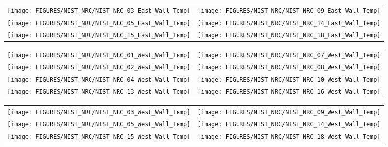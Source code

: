 \begin{figure}[p]
\begin{tabular*}{\textwidth}{l@{\extracolsep{\fill}}r}
\texttt{[image: FIGURES/NIST\_NRC/NIST\_NRC\_03\_East\_Wall\_Temp]} &
\texttt{[image: FIGURES/NIST\_NRC/NIST\_NRC\_09\_East\_Wall\_Temp]} \\
\texttt{[image: FIGURES/NIST\_NRC/NIST\_NRC\_05\_East\_Wall\_Temp]} &
\texttt{[image: FIGURES/NIST\_NRC/NIST\_NRC\_14\_East\_Wall\_Temp]} \\
\texttt{[image: FIGURES/NIST\_NRC/NIST\_NRC\_15\_East\_Wall\_Temp]} &
\texttt{[image: FIGURES/NIST\_NRC/NIST\_NRC\_18\_East\_Wall\_Temp]}
\end{tabular*}
\label{NIST_NRC_East_Wall_Temp_Open}
\end{figure}

\begin{figure}[p]
\begin{tabular*}{\textwidth}{l@{\extracolsep{\fill}}r}
\texttt{[image: FIGURES/NIST\_NRC/NIST\_NRC\_01\_West\_Wall\_Temp]} &
\texttt{[image: FIGURES/NIST\_NRC/NIST\_NRC\_07\_West\_Wall\_Temp]} \\
\texttt{[image: FIGURES/NIST\_NRC/NIST\_NRC\_02\_West\_Wall\_Temp]} &
\texttt{[image: FIGURES/NIST\_NRC/NIST\_NRC\_08\_West\_Wall\_Temp]} \\
\texttt{[image: FIGURES/NIST\_NRC/NIST\_NRC\_04\_West\_Wall\_Temp]} &
\texttt{[image: FIGURES/NIST\_NRC/NIST\_NRC\_10\_West\_Wall\_Temp]} \\
\texttt{[image: FIGURES/NIST\_NRC/NIST\_NRC\_13\_West\_Wall\_Temp]} &
\texttt{[image: FIGURES/NIST\_NRC/NIST\_NRC\_16\_West\_Wall\_Temp]}
\end{tabular*}
\label{NIST_NRC_West_Wall_Temp_Closed}
\end{figure}

\begin{figure}[p]
\begin{tabular*}{\textwidth}{l@{\extracolsep{\fill}}r}
\texttt{[image: FIGURES/NIST\_NRC/NIST\_NRC\_03\_West\_Wall\_Temp]} &
\texttt{[image: FIGURES/NIST\_NRC/NIST\_NRC\_09\_West\_Wall\_Temp]} \\
\texttt{[image: FIGURES/NIST\_NRC/NIST\_NRC\_05\_West\_Wall\_Temp]} &
\texttt{[image: FIGURES/NIST\_NRC/NIST\_NRC\_14\_West\_Wall\_Temp]} \\
\texttt{[image: FIGURES/NIST\_NRC/NIST\_NRC\_15\_West\_Wall\_Temp]} &
\texttt{[image: FIGURES/NIST\_NRC/NIST\_NRC\_18\_West\_Wall\_Temp]}
\end{tabular*}
\label{NIST_NRC_West_Wall_Temp_Open}
\end{figure}

